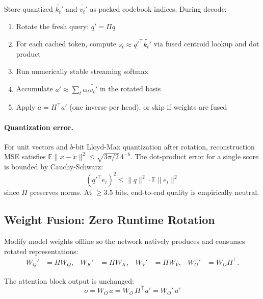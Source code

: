 \documentclass[nobib]{tufte-handout}
\begin{document}
Store quantized $\tilde{k_t'}$ and $\tilde{v_t'}$ as packed codebook indices. During decode:
\begin{enumerate}
  \item Rotate the fresh query: $q' = \Pi q$
  \item For each cached token, compute $s_t \approx q'^\top \tilde{k_t'}$ via fused centroid lookup and dot product
  \item Run numerically stable streaming softmax
  \item Accumulate $a' \approx \sum_t \alpha_t \tilde{v_t'}$ in the rotated basis
  \item Apply $a = \Pi^\top a'$ (one inverse per head), or skip if weights are fused
\end{enumerate}

\paragraph{Quantization error.}
For unit vectors and $b$-bit Lloyd-Max quantization after rotation, reconstruction MSE satisfies $\mathbb{E}\|x - \tilde{x}\|^2 \le \sqrt{3\pi/2}\,4^{-b}$. The dot-product error for a single score is bounded by Cauchy-Schwarz:
\[
  (q'^\top e_t)^2 \le \|q\|^2 \cdot \mathbb{E}\|e_t\|^2
\]
since $\Pi$ preserves norms. At ${\ge}3.5$ bits, end-to-end quality is empirically neutral.


\subsection{Weight Fusion: Zero Runtime Rotation}\label{sec:weight-fusion}

Modify model weights offline so the network natively produces and consumes rotated representations:
\begin{align*}
  W_Q' &= \Pi W_Q, & W_K' &= \Pi W_K, & W_V' &= \Pi W_V, & W_O' &= W_O \Pi^\top.
\end{align*}

The attention block output is unchanged:
\[
  o = W_O\,a = W_O\,\Pi^\top a' = W_O'\,a'
\]
\end{document}
